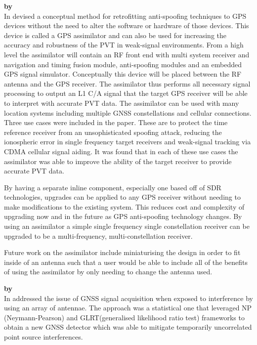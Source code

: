 \medskip

\textbf{\emph{} by \citeauthor{RN19}} \\
In \citeyear{RN19} \citeauthor{RN19} \cite{RN19} devised a conceptual method for retrofitting anti-spoofing techniques to GPS devices without the need to alter the
software or hardware of those devices. This device is called a GPS assimilator and can also be used for increasing the accuracy and robustness of the PVT in weak-signal
environments. From a high level the assimilator will contain an RF front end with multi system receiver and navigation and timing fusion module,  
anti-spoofing modules and an embedded GPS signal simulator. Conceptually this device will be placed between the RF antenna and the GPS receiver. The assimilator thus
performs all necessary signal processing to output an L1 C/A signal that the target GPS receiver will be able to interpret with accurate PVT data. The assimilator can be
used with many location systems including multiple GNSS constellations and cellular connections. Three use cases were included in the paper. These are to protect the time
reference receiver from an unsophisticated spoofing attack, reducing the ionospheric error in single frequency target receivers and weak-signal tracking via CDMA cellular
signal aiding. It was found that in each of these use cases the assimilator was able to improve
the ability of the target receiver to provide accurate PVT data.

By having a separate inline component, especially one based off of SDR technologies, upgrades can be applied to any GPS receiver without needing to make modifications to
the existing system. This reduces cost and complexity of upgrading now and in the future as GPS anti-spoofing technology changes. By using an assimilator a simple single
frequency single constellation receiver can be upgraded to be a multi-frequency, multi-constellation receiver.

Future work on the assimilator include miniaturising the design in order to fit inside of an antenna such that a user would be able to include all of the benefits of using
the assimilator by only needing to change the antenna used. 

\medskip

\textbf{\emph{} by \citeauthor{RN20}} \\
In  \citeauthor{RN20} \cite{RN20} addressed the issue of GNSS signal acquisition when exposed to interference by using an array of antennae.
The approach was a statistical one that leveraged NP (Neymann-Pearson) and GLRT(generalised likelihood ratio test) frameworks to obtain a new GNSS detector 
which was able to mitigate temporarily uncorrelated point source interferences. 

